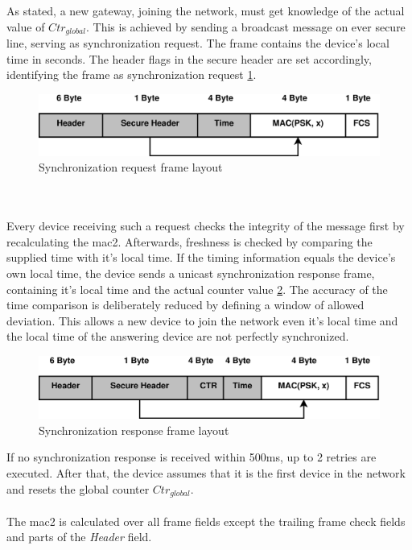 As stated, a new gateway, joining the network, must get knowledge of the actual value of $Ctr_{global}$. This is achieved by sending a broadcast message on
ever secure line, 
serving as synchronization request. The frame  contains the device's local time in seconds. The header flags in the secure header are set accordingly, identifying
the frame as synchronization request \ref{fig:syncReqFormat}.
\begin{figure}
  \centering
    \includegraphics[width=1\textwidth]{figures/formatSyncReq.eps}
 \caption{Synchronization request frame layout}
 \label{fig:syncReqFormat}
\end{figure}
\\
\\
Every device receiving such a request checks the integrity of the message first by recalculating the \gls{mac2}. Afterwards, freshness is checked by comparing
the supplied time with it's local time. If the timing information equals the device's own local time, the device sends a unicast synchronization response
frame, containing it's local time and the actual counter value \ref{fig:syncResFormat}. The accuracy of the time comparison is deliberately reduced by defining
a window of allowed deviation. This allows a new device to join the network even it's local time and the local time of the answering device are not 
perfectly synchronized.
\begin{figure}
  \centering
    \includegraphics[width=1\textwidth]{figures/formatSyncRes.eps}
 \caption{Synchronization response frame layout}
 \label{fig:syncResFormat}
\end{figure}
If no synchronization response is received within 500ms, up to 2 retries are executed. After that, the device assumes that it is the first device in the
network and resets the global counter $Ctr_{global}$.
\\
\\
The \gls{mac2} is calculated over all frame fields except the trailing frame check fields and parts of the \textit{Header} field. 

